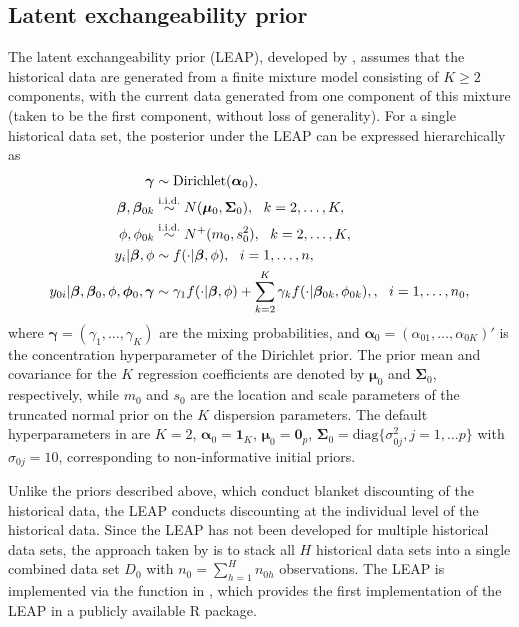 \subsection{Latent exchangeability prior}\label{sec:LEAP}
The latent exchangeability prior (LEAP), developed by \citet{alt2023leap}, assumes that the historical data are generated from a finite mixture model consisting of $K \ge 2$ components, with the current data generated from one component of this mixture (taken to be the first component, without loss of generality). For a single historical data set, the posterior under the LEAP can be expressed hierarchically as
\begin{align}
    \bm{\gamma} &\sim \text{Dirichlet}(\bm{\alpha}_0)
    ,\notag \\
    \bm{\beta}, \bm{\beta}_{0k} 
        &\overset{\text{i.i.d.}}{\sim}
        N(\bm{\mu}_0, \bm{\Sigma}_0)
    , \ \ k = 2, \ldots, K
    ,\notag \\
    \phi, \phi_{0k}
        &\overset{\text{i.i.d.}}{\sim}
        N^+(m_0, s_0^2)
    , \ \ k = 2, \ldots, K
    ,\notag \\
    y_i | \bm{\beta}, \phi &\sim f(\cdot | \bm{\beta}, \phi)
    , \ \  i = 1, \ldots, n
    , \notag \\
    y_{0i} | \bm{\beta}, \bm{\beta}_0, \phi, \bm{\phi}_0, \bm{\gamma} &\sim \gamma_1 f(\cdot | \bm{\beta}, \phi) + \sum_{k=2}^K \gamma_k f(\cdot | \bm{\beta}_{0k}, \phi_{0k}), 
    , \ \ i = 1, \ldots, n_0,
    \label{eq:leap}
\end{align}
where $\bm{\gamma} = (\gamma_1, \ldots, \gamma_K)$ are the mixing probabilities, and $\bm{\alpha}_0 = (\alpha_{01}, \ldots, \alpha_{0K})'$ is the concentration hyperparameter of the Dirichlet prior. The prior mean and covariance for the $K$ regression coefficients are denoted by $\bm{\mu}_0$ and $\bm{\Sigma}_0$, respectively, while $m_0$ and $s_0$ are the location and scale parameters of the truncated normal prior on the $K$ dispersion parameters. The default hyperparameters in  are $K = 2$, $\bm{\alpha}_0 = \bm{1}_K$, $\bm{\mu}_0 = \bm{0}_p$, $\bm{\Sigma}_0 = \text{diag}\{ \sigma_{0j}^2, j = 1, \ldots p \}$ with $\sigma_{0j} = 10$, corresponding to non-informative initial priors.

Unlike the priors described above, which conduct blanket discounting of the historical data, the LEAP conducts discounting at the individual level of the historical data. Since the LEAP has not been developed for multiple historical data sets, the approach taken by  is to stack all $H$ historical data sets into a single combined data set $D_0$ with $n_0 = \sum_{h=1}^H n_{0h}$ observations. The LEAP is implemented via the  function in , which provides the first implementation of the LEAP in a publicly available R package.

